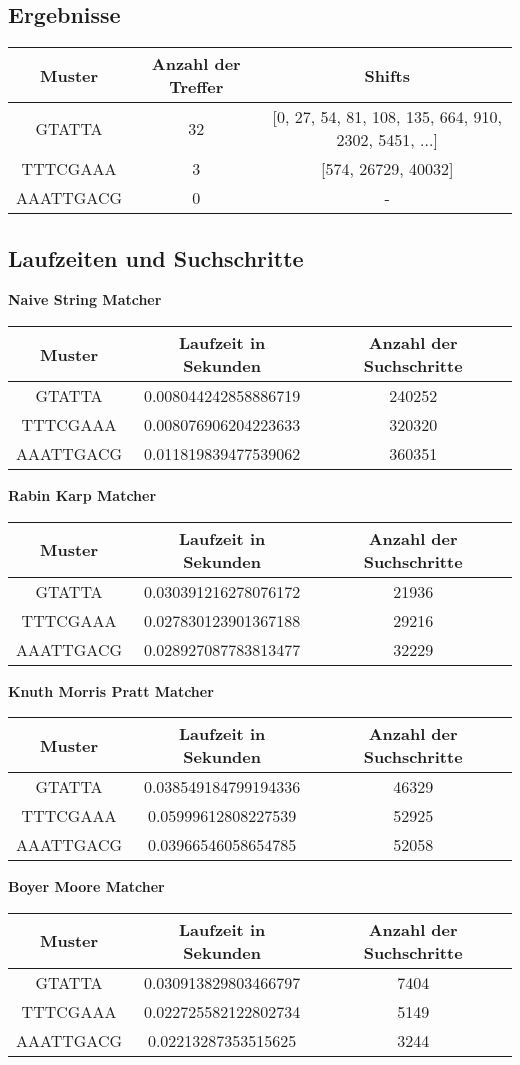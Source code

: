 \documentclass[a4paper,12pt]{article}
\begin{document}
\subsection*{Ergebnisse}
\begin{tabular}{c|c|c}
Muster & Anzahl der Treffer & Shifts \\
\hline
GTATTA & 32 &  [0, 27, 54, 81, 108, 135, 664, 910, 2302, 5451, $\hdots$] \\
TTTCGAAA & 3 & [574, 26729, 40032] \\
AAATTGACG & 0 & -
\end{tabular}
\subsection*{Laufzeiten und Suchschritte}
\textbf{Naive String Matcher}
\newline
\begin{tabular}{c|c|c}
Muster & Laufzeit in Sekunden & Anzahl der Suchschritte  \\
\hline
GTATTA & 0.008044242858886719 & 240252 \\
TTTCGAAA & 0.008076906204223633 & 320320 \\
AAATTGACG & 0.011819839477539062 & 360351
\end{tabular}
\newline \newline
\textbf{Rabin Karp Matcher}
\newline 
\begin{tabular}{c|c|c}
Muster & Laufzeit in Sekunden & Anzahl der Suchschritte  \\
\hline
GTATTA & 0.030391216278076172 & 21936 \\
TTTCGAAA & 0.027830123901367188 & 29216 \\
AAATTGACG & 0.028927087783813477 & 32229
\end{tabular}
\newpage
\textbf{Knuth Morris Pratt Matcher}
\newline 
\begin{tabular}{c|c|c}
Muster & Laufzeit in Sekunden & Anzahl der Suchschritte  \\
\hline
GTATTA & 0.038549184799194336 & 46329 \\
TTTCGAAA & 0.05999612808227539 & 52925 \\
AAATTGACG & 0.03966546058654785 & 52058
\end{tabular}
\newline \newline
\textbf{Boyer Moore Matcher}
\newline 
\begin{tabular}{c|c|c}
Muster & Laufzeit in Sekunden & Anzahl der Suchschritte  \\
\hline
GTATTA & 0.030913829803466797 & 7404 \\
TTTCGAAA & 0.022725582122802734 & 5149 \\
AAATTGACG & 0.02213287353515625 & 3244
\end{tabular}
\end{document}
